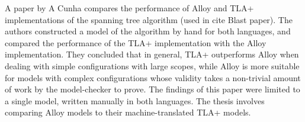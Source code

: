 







A paper \cite{hand-comparison} by A Cunha compares the performance of Alloy and TLA+ implementations of the spanning tree algorithm (used in cite Blast paper). The authors constructed a model of the algorithm by hand for both languages, and compared the performance of the TLA+ implementation with the Alloy implementation. They concluded that in general, TLA+ outperforms Alloy when dealing with simple configurations with large scopes, while Alloy is more suitable for models with complex configurations whose validity takes a non-trivial amount of work by the model-checker to prove. The findings of this paper were limited to a single model, written manually in both languages. The thesis involves comparing Alloy models to their machine-translated TLA+ models.